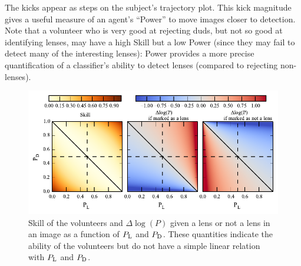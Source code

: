 \documentclass[useAMS,usenatbib,a4paper]{mn2e}
\begin{document}
The kicks appear as steps on the subject's trajectory plot. This kick
magnitude gives a useful measure of an agent's ``Power'' to move
images closer to detection.  Note that a volunteer who is very good at
rejecting duds, but not so good at identifying lenses, may have a high
Skill but a low Power (since they may fail to detect many of the
interesting lenses): Power provides a more precise quantification of a
classifier's ability to detect lenses (compared to rejecting non-lenses).


\begin{figure}
\begin{center}
\includegraphics[scale=1.0]{sw-cfhtls-figs/dlnp_skill.pdf}
\caption{ \label{fig:skilldlnp}
Skill of the volunteers and $\Delta\log(P)$ given a lens or not a lens in
an image as a function of $P_{\rm L}$ and $P_{\rm D}$. These
quantities indicate the ability of the volunteers but do not have a simple
linear relation with $P_{\rm L}$ and $P_{\rm D}$.  
}
\end{center}
\end{figure}







% 


%




\label{lastpage}
\bsp
\end{document}
